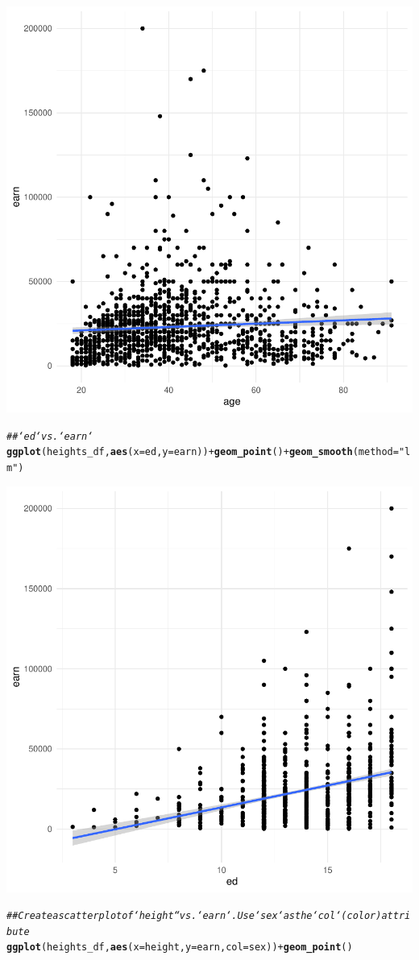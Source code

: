 \documentclass{article}\usepackage[]{graphicx}\usepackage[]{xcolor}
\makeatletter
\newcommand{\hlstr}[1]{\textcolor[rgb]{0.192,0.494,0.8}{#1}}%
\newcommand{\hlcom}[1]{\textcolor[rgb]{0.678,0.584,0.686}{\textit{#1}}}%
\newcommand{\hlopt}[1]{\textcolor[rgb]{0,0,0}{#1}}%
\newcommand{\hlstd}[1]{\textcolor[rgb]{0.345,0.345,0.345}{#1}}%
\newcommand{\hlkwc}[1]{\textcolor[rgb]{0.333,0.667,0.333}{#1}}%
\newcommand{\hlkwd}[1]{\textcolor[rgb]{0.737,0.353,0.396}{\textbf{#1}}}%
\newenvironment{kframe}{%
 \def\at@end@of@kframe{}%
 \ifinner\ifhmode%
  \def\at@end@of@kframe{\end{minipage}}%
  \begin{minipage}{\columnwidth}%
 \fi\fi%
 \def\FrameCommand##1{\hskip\@totalleftmargin \hskip-\fboxsep
 \colorbox{shadecolor}{##1}\hskip-\fboxsep
     \hskip-\linewidth \hskip-\@totalleftmargin \hskip\columnwidth}%
 \MakeFramed {\advance\hsize-\width
   \@totalleftmargin\z@ \linewidth\hsize
   \@setminipage}}%
 {\par\unskip\endMakeFramed%
 \at@end@of@kframe}
\newenvironment{knitrout}{}{} %
\makeatother
\begin{document}
\begin{knitrout}
{\centering \includegraphics[width=.6\linewidth]{figure/assignment-03-Quintero-Vasquez-Johnatan-Rnwauto-report-5} 

}


\begin{kframe}\begin{alltt}
\hlcom{## `ed` vs. `earn`}
\hlkwd{ggplot}\hlstd{(heights_df,} \hlkwd{aes}\hlstd{(}\hlkwc{x} \hlstd{= ed,} \hlkwc{y} \hlstd{= earn))} \hlopt{+} \hlkwd{geom_point}\hlstd{()} \hlopt{+} \hlkwd{geom_smooth}\hlstd{(}\hlkwc{method} \hlstd{=} \hlstr{"lm"}\hlstd{)}
\end{alltt}


{\ttfamily\noindent\itshape{}}\end{kframe}

{\centering \includegraphics[width=.6\linewidth]{figure/assignment-03-Quintero-Vasquez-Johnatan-Rnwauto-report-6} 

}


\begin{kframe}\begin{alltt}
\hlcom{## Create a scatterplot of `height`` vs. `earn`.  Use `sex` as the `col` (color) attribute}
\hlkwd{ggplot}\hlstd{(heights_df,} \hlkwd{aes}\hlstd{(}\hlkwc{x} \hlstd{= height,} \hlkwc{y} \hlstd{= earn,} \hlkwc{col}\hlstd{=sex))} \hlopt{+} \hlkwd{geom_point}\hlstd{()}
\end{alltt}
\end{kframe}


\end{knitrout}
\end{document}
